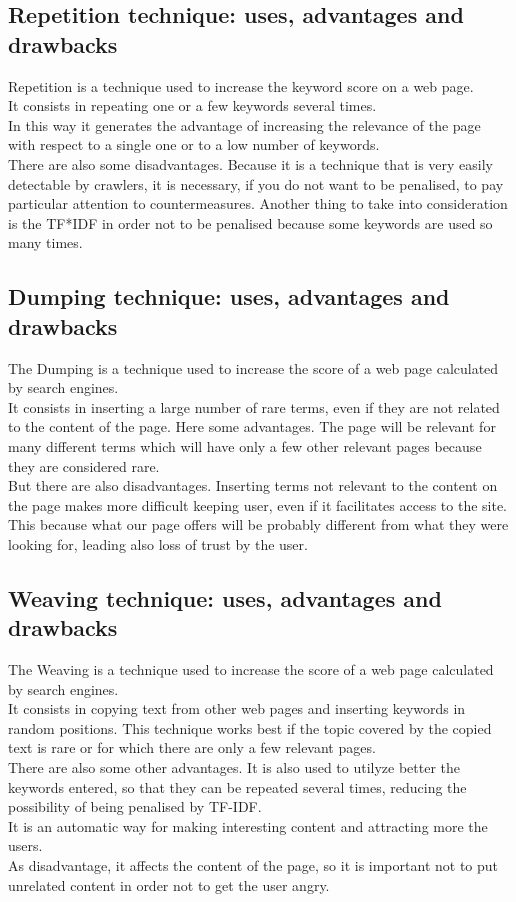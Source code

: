 \subsection{Repetition technique: uses, advantages and drawbacks}
Repetition is a technique used to increase the keyword score on a web page.\\
It consists in repeating one or a few keywords several times.\\
In this way
it generates the advantage of
increasing the relevance of the page with respect to a single one
or to a low number of keywords.\\ There are also some disadvantages.
Because it is a technique that is very easily
detectable by crawlers, it is necessary, if you do not want to be penalised,
to pay particular attention to countermeasures.
Another thing to take into consideration is the TF*IDF in order not to be
penalised because some keywords are used so many times.

\subsection{Dumping technique: uses, advantages and drawbacks}
The Dumping is a technique used to increase the score of a
web page calculated by search engines.\\
It consists in inserting a large number of rare terms, even if they
are not related to the content of the page. Here some advantages.
The page will be relevant for many different terms which will have only
a few other relevant pages because they are considered rare.\\
But there are also disadvantages.
Inserting terms not relevant to the content on the page makes more difficult
keeping user, even if it facilitates access to the site.
This because what our page offers will be probably different from what
they were looking for, leading also loss of trust by the user.

\subsection{Weaving technique: uses, advantages and drawbacks}
The Weaving is a technique used to increase the score of a web page
calculated by search engines.\\
It consists in copying text from other web pages and inserting keywords
in random positions.
This technique works best if the topic covered by the copied text is rare
or for which there are only a few relevant pages.\\
There are also some other advantages. It is also used to utilyze better
the keywords entered,
so that they can be repeated several times, reducing the possibility
of being penalised by TF-IDF.\\ It is an automatic way for making
interesting content and attracting more the users.\\
As disadvantage, it affects the content of the page, so
it is important not to put unrelated content in order not to get the user
angry.

